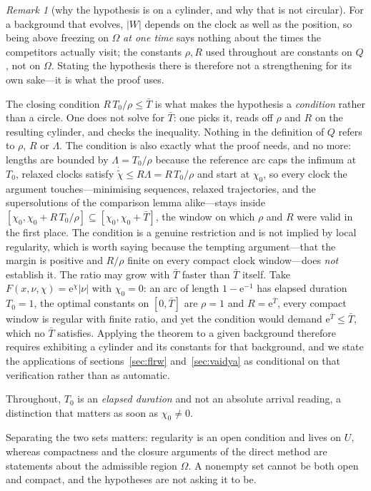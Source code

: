 \documentclass[12pt]{iopart}
\theoremstyle{plain}
\theoremstyle{definition}
\theoremstyle{plain}
\theoremstyle{remark}
\newtheorem*{remark}{Remark}
\begin{document}
\begin{remark}[why the hypothesis is on a cylinder, and why that is not circular]
\label{rmk:cylinder}
For a background that evolves, $|W|$ depends on the clock as well as the position,
so being above freezing on $\Omega$ \emph{at one time} says nothing about the times
the competitors actually visit; the constants $\rho,R$ used throughout are
constants on $Q$, not on $\Omega$. Stating the hypothesis there is therefore not a
strengthening for its own sake---it is what the proof uses.

The closing condition $R\,T_0/\rho\le\bar T$ is what makes the hypothesis a
\emph{condition} rather than a circle. One does not solve for $\bar T$: one picks
it, reads off $\rho$ and $R$ on the resulting cylinder, and checks the inequality.
Nothing in the definition of $Q$ refers to $\rho$, $R$ or $\Lambda$. The condition
is also exactly what the proof needs, and no more: lengths are bounded by
$\Lambda=T_0/\rho$ because the reference arc caps the infimum at $T_0$, relaxed
clocks satisfy $\dot{\tilde\chi}\le R\Lambda=R\,T_0/\rho$ and start at $\chi_0$, so
every clock the argument touches---minimising sequences, relaxed trajectories, and
the supersolutions of the comparison lemma alike---stays inside
$[\chi_0,\chi_0+R\,T_0/\rho]\subseteq[\chi_0,\chi_0+\bar T]$, the window on which
$\rho$ and $R$ were valid in the first place. The condition is a genuine restriction and is
not implied by local regularity, which is worth saying because the tempting
argument---that the margin is positive and $R/\rho$ finite on every compact clock
window---does \emph{not} establish it. The ratio may grow with $\bar T$ faster than
$\bar T$ itself. Take $F(x,\nu,\chi)=\mathrm e^{\chi}|\nu|$ with $\chi_0=0$: an arc
of length $1-\mathrm e^{-1}$ has elapsed duration $T_0=1$, the optimal constants on
$[0,\bar T]$ are $\rho=1$ and $R=\mathrm e^{\bar T}$, every compact window is
regular with finite ratio, and yet the condition would demand
$\mathrm e^{\bar T}\le\bar T$, which no $\bar T$ satisfies. Applying the theorem to a
given background therefore requires exhibiting a cylinder and its constants for
that background, and we state the applications of sections~\ref{sec:flrw}
and~\ref{sec:vaidya} as conditional on that verification rather than as automatic.

Throughout, $T_0$ is an \emph{elapsed duration} and not an absolute arrival
reading, a distinction that matters as soon as $\chi_0\neq0$.
\end{remark}

Separating the two sets matters: regularity is an open condition and lives on $U$,
whereas compactness and the closure arguments of the direct method are statements
about the admissible region $\Omega$. A nonempty set cannot be both open and compact,
and the hypotheses are not asking it to be.
\end{document}
